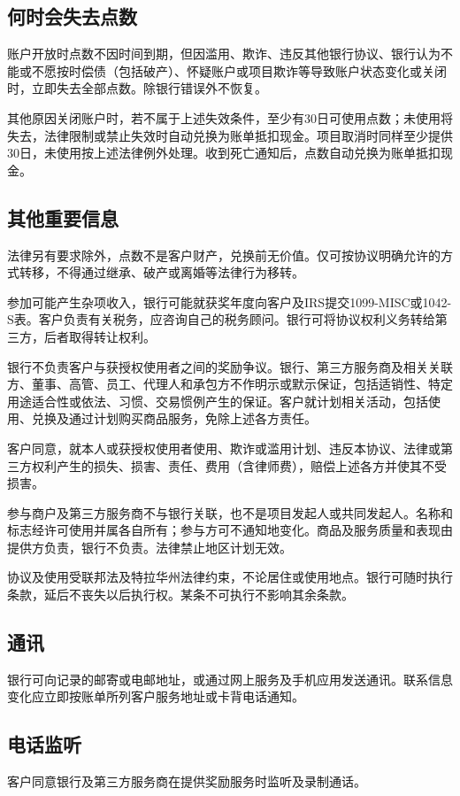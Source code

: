 \documentclass[UTF8,fontset=none,11pt,a4paper]{ctexart}
\begin{document}
\subsection*{何时会失去点数}
账户开放时点数不因时间到期，但因滥用、欺诈、违反其他银行协议、银行认为不能或不愿按时偿债（包括破产）、怀疑账户或项目欺诈等导致账户状态变化或关闭时，立即失去全部点数。除银行错误外不恢复。


其他原因关闭账户时，若不属于上述失效条件，至少有30日可使用点数；未使用将失去，法律限制或禁止失效时自动兑换为账单抵扣现金。项目取消时同样至少提供30日，未使用按上述法律例外处理。收到死亡通知后，点数自动兑换为账单抵扣现金。


\subsection*{其他重要信息}
法律另有要求除外，点数不是客户财产，兑换前无价值。仅可按协议明确允许的方式转移，不得通过继承、破产或离婚等法律行为移转。


参加可能产生杂项收入，银行可能就获奖年度向客户及IRS提交1099-MISC或1042-S表。客户负责有关税务，应咨询自己的税务顾问。银行可将协议权利义务转给第三方，后者取得转让权利。


银行不负责客户与获授权使用者之间的奖励争议。银行、第三方服务商及相关关联方、董事、高管、员工、代理人和承包方不作明示或默示保证，包括适销性、特定用途适合性或依法、习惯、交易惯例产生的保证。客户就计划相关活动，包括使用、兑换及通过计划购买商品服务，免除上述各方责任。


客户同意，就本人或获授权使用者使用、欺诈或滥用计划、违反本协议、法律或第三方权利产生的损失、损害、责任、费用（含律师费），赔偿上述各方并使其不受损害。


参与商户及第三方服务商不与银行关联，也不是项目发起人或共同发起人。名称和标志经许可使用并属各自所有；参与方可不通知地变化。商品及服务质量和表现由提供方负责，银行不负责。法律禁止地区计划无效。


协议及使用受联邦法及特拉华州法律约束，不论居住或使用地点。银行可随时执行条款，延后不丧失以后执行权。某条不可执行不影响其余条款。


\subsection*{通讯}
银行可向记录的邮寄或电邮地址，或通过网上服务及手机应用发送通讯。联系信息变化应立即按账单所列客户服务地址或卡背电话通知。


\subsection*{电话监听}
客户同意银行及第三方服务商在提供奖励服务时监听及录制通话。
\end{document}

